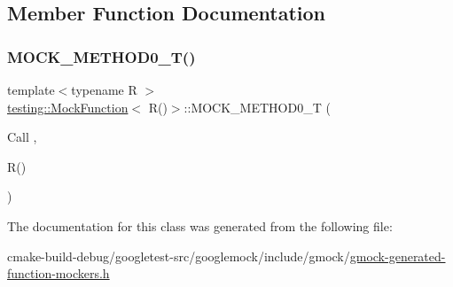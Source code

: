 \subsection{Member Function Documentation}
\mbox{\label{classtesting_1_1MockFunction_3_01R_07_08_4_a08e7016e3e060a5cd375b66ff0cc04e8}} 
\subsubsection{\texorpdfstring{MOCK\_METHOD0\_T()}{MOCK\_METHOD0\_T()}}
{\footnotesize\ttfamily template$<$typename R $>$ \\
\mbox{\hyperlink{classtesting_1_1MockFunction}{testing\+::\+Mock\+Function}}$<$ R()$>$\+::M\+O\+C\+K\+\_\+\+M\+E\+T\+H\+O\+D0\+\_\+T (\begin{DoxyParamCaption}\item[{Call}]{,  }\item[{R()}]{ }\end{DoxyParamCaption})}



The documentation for this class was generated from the following file\+:\begin{DoxyCompactItemize}
\item 
cmake-\/build-\/debug/googletest-\/src/googlemock/include/gmock/\mbox{\hyperlink{gmock-generated-function-mockers_8h}{gmock-\/generated-\/function-\/mockers.\+h}}\end{DoxyCompactItemize}
